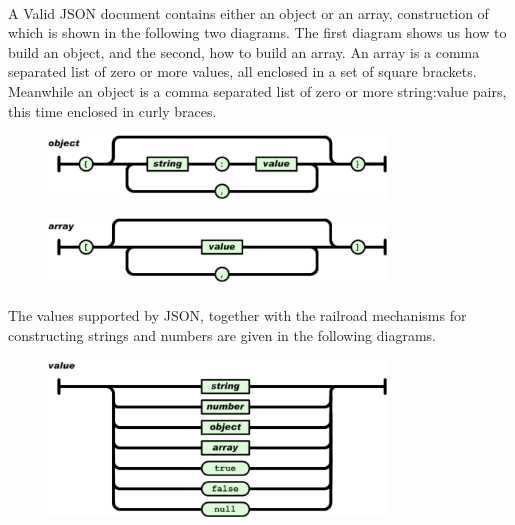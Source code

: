 \paragraph{} A Valid JSON document contains either an object or an array, construction of which is shown in the following two diagrams. The first diagram shows us how to build an object, and the second, how to build an array. An array is a comma separated list of zero or more values, all enclosed in a set of square brackets. Meanwhile an object is a comma separated list of zero or more string:value pairs, this time enclosed in curly braces.


\begin{figure}[H]
\centering
\includegraphics[width=0.8\textwidth]{figures/json-object}
\label{fig:json-object}
\caption{}
\end{figure}

\begin{figure}[H]
\centering
\includegraphics[width=0.8\textwidth]{figures/json-array}
\label{fig:json-array}
\caption{}
\end{figure}

\paragraph{} The values supported by JSON, together with the railroad mechanisms for constructing strings and numbers are given in the following diagrams.


\begin{figure}[H]
\centering
\includegraphics[width=0.8\textwidth]{figures/json-value}
\label{fig:json-value}
\caption{}
\end{figure}

